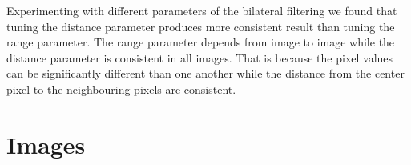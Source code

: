 \documentclass[a4paper, english]{article}
\begin{document}
Experimenting with different parameters of the bilateral filtering we found that tuning the distance parameter produces more consistent result than tuning the range parameter. The range parameter depends from image to image while the distance parameter is consistent in all images. That is because the pixel values can be significantly different than one another while the distance from the center pixel to the neighbouring pixels are consistent.

\nocite{*}



\appendix

\section{Images}
\end{document}

